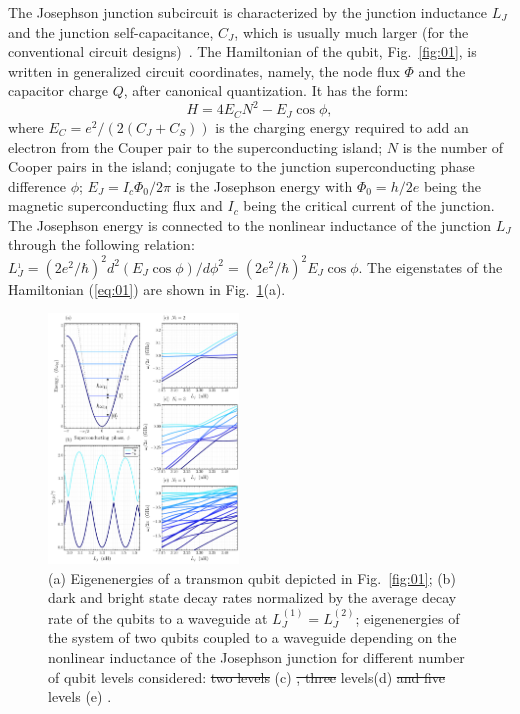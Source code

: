 \documentclass[lettersize,journal]{IEEEtran}
\providecommand{\DIFaddtex}[1]{{\protect\color{blue}\uwave{#1}}} %
\providecommand{\DIFdeltex}[1]{{\protect\color{red}\sout{#1}}}                      %
\providecommand{\DIFaddFL}[1]{\DIFadd{#1}} %
\providecommand{\DIFdelFL}[1]{\DIFdel{#1}} %
\providecommand{\DIFaddbeginFL}{} %
\providecommand{\DIFaddendFL}{} %
\providecommand{\DIFdelbeginFL}{} %
\providecommand{\DIFdelendFL}{} %
\providecommand{\DIFadd}[1]{\texorpdfstring{\DIFaddtex{#1}}{#1}} %
\providecommand{\DIFdel}[1]{\texorpdfstring{\DIFdeltex{#1}}{}} %
\newcommand{\DIFscaledelfig}{0.5}
\newlength{\DIFdelgraphicswidth} %
\newlength{\DIFdelgraphicsheight} %
\newcommand{\DIFaddincludegraphics}[2][]{{\color{blue}\fbox{\DIFOincludegraphics[#1]{#2}}}} %
\newcommand{\DIFdelincludegraphics}[2][]{%
\sbox{\DIFdelgraphicsbox}{\DIFOincludegraphics[#1]{#2}}%
\settoboxwidth{\DIFdelgraphicswidth}{\DIFdelgraphicsbox} %
\settoboxtotalheight{\DIFdelgraphicsheight}{\DIFdelgraphicsbox} %
\scalebox{\DIFscaledelfig}{%
\parbox[b]{\DIFdelgraphicswidth}{\usebox{\DIFdelgraphicsbox}\\[-\baselineskip] \rule{\DIFdelgraphicswidth}{0em}}\llap{\resizebox{\DIFdelgraphicswidth}{\DIFdelgraphicsheight}{%
\setlength{\unitlength}{\DIFdelgraphicswidth}%
\begin{picture}(1,1)%
\thicklines\linethickness{2pt} %
{\color[rgb]{1,0,0}\put(0,0){\framebox(1,1){}}}%
{\color[rgb]{1,0,0}\put(0,0){\line( 1,1){1}}}%
{\color[rgb]{1,0,0}\put(0,1){\line(1,-1){1}}}%
\end{picture}%
}\hspace*{3pt}}} %
} %
\DeclareRobustCommand{\DIFaddbeginFL}{\DIFOaddbeginFL \let\includegraphics\DIFaddincludegraphics} %
\DeclareRobustCommand{\DIFaddendFL}{\DIFOaddendFL \let\includegraphics\DIFOincludegraphics} %
\DeclareRobustCommand{\DIFdelbeginFL}{\DIFOdelbeginFL \let\includegraphics\DIFdelincludegraphics} %
\DeclareRobustCommand{\DIFdelendFL}{\DIFOaddendFL \let\includegraphics\DIFOincludegraphics} %
\begin{document}
The Josephson junction subcircuit is characterized by the junction inductance $L_J$ and the junction self-capacitance, $C_J$, which is usually much larger (for the conventional circuit designs)~\cite{krantz_quantum_2019}.
The Hamiltonian of the qubit, Fig.~\ref{fig:01}, is written in generalized circuit coordinates, namely, the node flux $\Phi$ and the capacitor charge $Q$, after canonical quantization.
It has the form:
\begin{equation}\label{eq:01}
    H = 4 E_C N^2 - E_J \cos \phi,
\end{equation}
where $E_C = e^2 / (2 (C_J + C_S))$ is the charging energy required to add an electron from the Couper pair to the superconducting island; $N$ is the number of Cooper pairs in the island; conjugate to the junction superconducting phase difference $\phi$; $E_J = I_c \Phi_0 / 2\pi$ is the Josephson energy with $\Phi_0 = h / 2e$ being the magnetic superconducting flux and $I_c$ being the critical current of the junction.
The Josephson energy is connected to the nonlinear inductance of the junction $L_J$ through the following relation: $L_J^{_1} = (2e^2 / \hbar)^2 d^2(E_J \cos \phi) / d\phi^2 = (2e^2 / \hbar)^2 E_J \cos \phi$. 
The eigenstates of the Hamiltonian (\ref{eq:01}) are shown in Fig.~\ref{fig:02}(a).

\begin{figure}[h]
    \centering
    \includegraphics[width=0.45\textwidth]{fig_2}
    \caption{(a) Eigenenergies of a transmon qubit depicted in Fig.~\ref{fig:01}; (b) dark and bright state decay rates normalized by the average decay rate of the qubits to a waveguide at $L_J^{(1)} = L_J^{(2)}$; eigenenergies of the system of two qubits coupled to a waveguide depending on the nonlinear inductance of the Josephson junction for different number of qubit levels considered: \DIFdelbeginFL \DIFdelFL{two levels }\DIFdelendFL (c) \DIFdelbeginFL \DIFdelFL{, three }\DIFdelendFL \DIFaddbeginFL \DIFaddFL{two }\DIFaddendFL levels\DIFaddbeginFL \DIFaddFL{, }\DIFaddendFL (d) \DIFdelbeginFL \DIFdelFL{and five }\DIFdelendFL \DIFaddbeginFL \DIFaddFL{three }\DIFaddendFL levels \DIFaddbeginFL \DIFaddFL{and }\DIFaddendFL (e) \DIFaddbeginFL \DIFaddFL{five levels}\DIFaddendFL .}
    \label{fig:02}
\end{figure}
\end{document}
